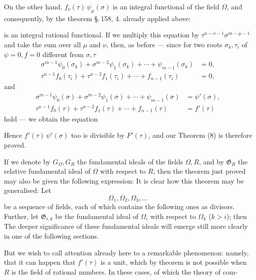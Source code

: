On the other hand, $f_\nu(\tau)\,\psi_\mu(\sigma)$ is an integral functional of the field
$\Omega$, and consequently, by the theorem \S.\,158, 4. already applied above:

is an integral rational functional. If we multiply this equation by
$\tau^{n-\nu-1}\sigma^{m-\mu-1}$ and take the sum over all $\mu$ and $\nu$, then,
as before — since for two roots $\sigma_k, \tau_i$ of $\psi=0, f=0$ different
from $\sigma, \tau$
\[
\begin{aligned}
\sigma^{m-1}\psi_0(\sigma_k) + \sigma^{m-2}\psi_1(\sigma_k) + \cdots + \psi_{m-1}(\sigma_k) &= 0,\\
\tau^{n-1} f_0(\tau_i) + \tau^{n-2} f_1(\tau_i) + \cdots + f_{n-1}(\tau_i) &= 0,
\end{aligned}
\]
and
\[
\begin{aligned}
\sigma^{m-1}\psi_0(\sigma) + \sigma^{m-2}\psi_1(\sigma) + \cdots + \psi_{m-1}(\sigma) &= \psi'(\sigma),\\
\tau^{n-1} f_0(\tau) + \tau^{n-2} f_1(\tau) + \cdots + f_{n-1}(\tau) &= f'(\tau)
\end{aligned}
\]
hold — we obtain the equation

Hence $f'(\tau)\,\psi'(\sigma)$ too is divisible by $F'(\tau)$, and our Theorem (8)
is therefore proved.

If we denote by $G_\Omega, G_R$ the fundamental ideals of the fields $\Omega, R$, and by
$\mathfrak{G}_R$ the relative fundamental ideal of $\Omega$ with respect to $R$, then the
theorem just proved may also be given the following expression:
It is clear how this theorem may be generalised: Let
\[
\Omega_1, \Omega_2, \Omega_3, \ldots
\]
be a sequence of fields, each of which contains the following ones as divisors. Further, let
$\mathfrak{G}_{i,k}$ be the fundamental ideal of $\Omega_i$ with respect to
$\Omega_k$ ($k > i$); then
The deeper significance of these fundamental ideals will emerge still more clearly in one
of the following sections.

But we wish to call attention already here to a remarkable phenomenon: namely, that it can
happen that $f'(\tau)$ is a unit, which by  theorem is not
possible when $R$ is the field of rational numbers. In these cases, of which the theory of com-
